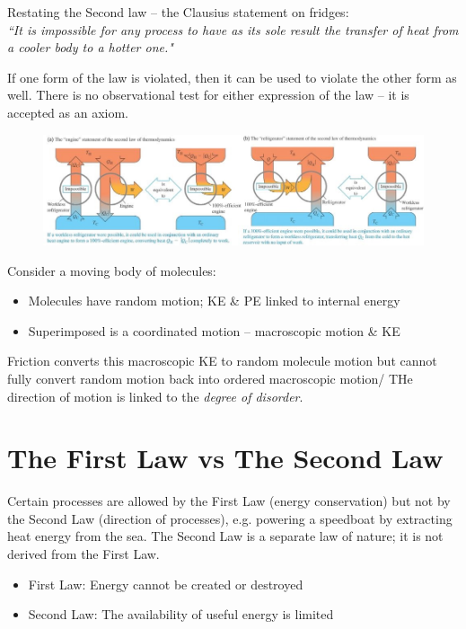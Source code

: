 \documentclass[a4paper, 11pt, normalem]{report}
\begin{document}
Restating the Second law -- the Clausius statement on fridges: \\
\emph{``It is impossible for any process to have as its sole result the transfer of heat from a cooler body to a hotter one."}

If one form of the law is violated, then it can be used to violate the other form as well.
There is no observational test for either expression of the law -- it is accepted as an axiom.
\begin{figure}[H]
    \centering
    \includegraphics[scale=0.69]{Impossible.jpg}
\end{figure}
Consider a moving body of molecules:
\begin{itemize}
	\item Molecules have random motion; KE \& PE linked to internal energy
	\item Superimposed is a coordinated motion -- macroscopic motion \& KE
\end{itemize}
Friction converts this macroscopic KE to random molecule motion but cannot fully convert random motion back into ordered macroscopic motion/
THe direction of motion is linked to the \emph{degree of disorder}.

\section{The First Law vs The Second Law}
Certain processes are allowed by the First Law (energy conservation) but not by the Second Law (direction of processes), e.g. powering a speedboat by extracting heat energy from the sea.
The Second Law is a separate law of nature; it is not derived from the First Law.

\begin{itemize}
    \item First Law: Energy cannot be created or destroyed
    \item Second Law: The availability of useful energy is limited
\end{itemize}
\end{document}
